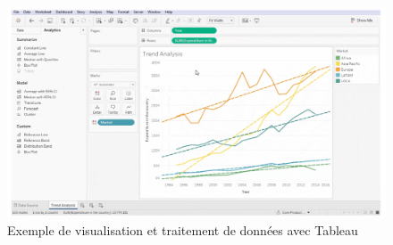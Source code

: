\begin{figure}[ht!]
  \includegraphics[width=\textwidth]{img/state_of_the_art/tableau.png}
  \caption{Exemple de visualisation et traitement de données avec Tableau \cite{tableau_ex}}
  \label{fig:tab_ex}
\end{figure}
